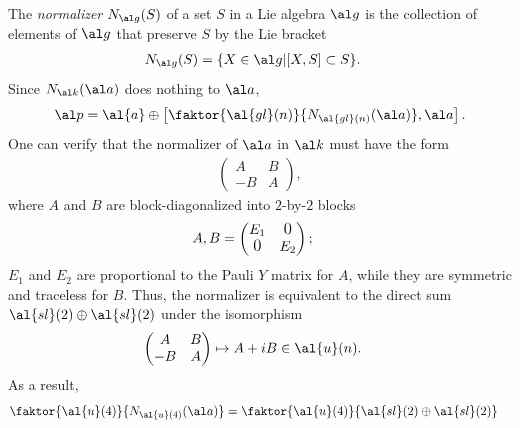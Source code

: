 The \emph{normalizer} $N_{\al g}(S)$ of a set $S$ in a Lie algebra $\al g$ is the collection of elements of $\al g$ that preserve $S$ by the Lie bracket
\begin{align}
	N_{\al g}(S) &= \{ X \in \al g| [X,S] \subset S \}.
\end{align}
Since $N_{\al k}(\al a)$ does nothing to $\al a$,
\begin{align}
	\al p = \al{a} \oplus \left[ \faktor{\al{gl}(n)}{N_{\al{gl}(n)}(\al a)} , \al a \right] .
\end{align}
One can verify that the normalizer of $\al a$ in $\al k$ must have the form
\begin{align}
	\begin{pmatrix}
	A & B \\
    -B & A
	\end{pmatrix},
\end{align}
where $A$ and $B$ are block-diagonalized into $2$-by-$2$ blocks
\begin{align}
	A,B &= \begin{pmatrix}
	 		E_1 & \text{\large 0} \\
	 		\text{\large 0} & E_2
	 	\end{pmatrix};
\end{align}
$E_1$ and $E_2$ are proportional to the Pauli $Y$ matrix for $A$, while they are symmetric and traceless for $B$. Thus, the normalizer is equivalent to the direct sum $\al{sl}(2) \oplus \al{sl}(2)$ under the isomorphism
\begin{align}
	\begin{pmatrix}
		A & B \\
		-B & A
	\end{pmatrix}
	&\mapsto A+iB \in \al{u}(n).
\end{align}
As a result,
\begin{align}\label{second-layer}
	\faktor{\al{u}(4)}{N_{\al{u}(4)}(\al a)} &= \faktor{\al{u}(4)}{\al{sl}(2) \oplus \al{sl}(2)}
\end{align}

